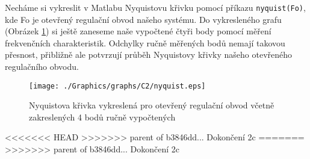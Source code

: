 \documentclass{article}
\begin{document}
			\noindent
			Necháme si vykreslit v Matlabu Nyquistovu křivku pomocí příkazu \verb*|nyquist(Fo)|, kde Fo je otevřený regulační obvod našeho systému. Do vykresleného grafu (Obrázek \ref{pic:nyquist}) si ještě zaneseme naše vypočtené čtyři body pomocí měření frekvenčních charakteristik. Odchylky ručně měřených bodů nemají takovou přesnost, přibližně ale potvrzují průběh Nyquistovy křivky našeho otevřeného regulačního obvodu.
			\begin{figure}[H]
				\centering
				\texttt{[image: ./Graphics/graphs/C2/nyquist.eps]}
				\caption{Nyquistova křivka vykreslená pro otevřený regulační obvod včetně zakreslených 4 bodů ručně vypočtených}
				\label{pic:nyquist}
			\end{figure}
			\noindent
			
<<<<<<< HEAD
>>>>>>> parent of b3846dd... Dokončení 2c
=======
>>>>>>> parent of b3846dd... Dokončení 2c
\end{document}
